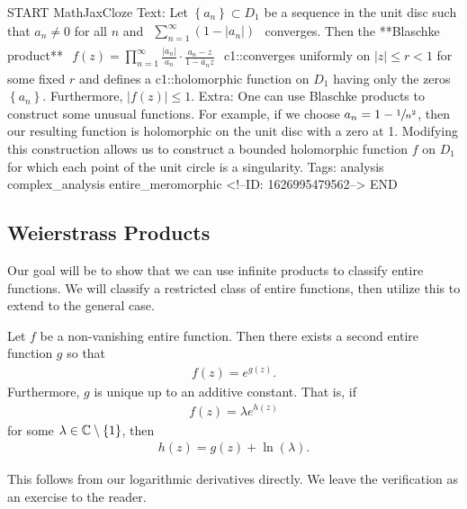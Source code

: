 \documentclass{memoir}
\begin{document}
\begin{anki}
START
MathJaxCloze
Text: Let \(\left\{ a_n \right\} \subset D_1 \) be a sequence in the unit disc such that \(a_n\neq 0\) for all \(n\) and
\(\begin{align*}
  	\sum_{n=1}^{\infty} (1-\left| a_n \right| )
  \end{align*}\)
converges.
Then the **Blaschke product**
\(\begin{align*}
  	f(z) = \prod_{n=1}^{\infty} \frac{\left| a_n \right| }{a_n}\cdot \frac{a_n - z}{1 - \overline{a}_n z} 
  \end{align*}\)
  {{c1::converges uniformly}} on \(\left| z \right| \leq r<1\) for some fixed \(r\) and defines a {{c1::holomorphic function on \(D_1\) having only the zeros \(\left\{ a_n \right\} \)}}.
Furthermore,  \(\left| f(z) \right| \leq 1\).
Extra: One can use Blaschke products to construct some unusual functions. For example, if we choose \(a_n = 1-\sfrac{1}{n^2}\), then our resulting function is holomorphic on the unit disc with a zero at 1. Modifying this construction allows us to construct a bounded holomorphic function \(f\) on \(D_1\) for which each point of the unit circle is a singularity.
Tags: analysis complex_analysis entire_meromorphic
<!--ID: 1626995479562-->
END
\end{anki}

\subsection{Weierstrass Products}
\label{sub:weierstrass_products}

Our goal will be to show that we can use infinite products to classify entire functions.
We will classify a restricted class of entire functions, then utilize this to extend to the general case.

\begin{thm}
	Let \(f\) be a non-vanishing entire function. Then there exists a second entire function \(g\) so that
	\begin{align*}
		f(z) = e^{g(z)}.
	\end{align*}
	Furthermore, \(g\) is unique up to an additive constant. That is, if
	\begin{align*}
		f(z) = \lambda e^{h(z)}
	\end{align*}
	for some \(\lambda \in \mathbb{C}\setminus\left\{ 1 \right\} \), then
	\begin{align*}
		h(z) = g(z) + \ln(\lambda ).
	\end{align*}
\end{thm}
This follows from our logarithmic derivatives directly.
We leave the verification as an exercise to the reader.
\end{document}
